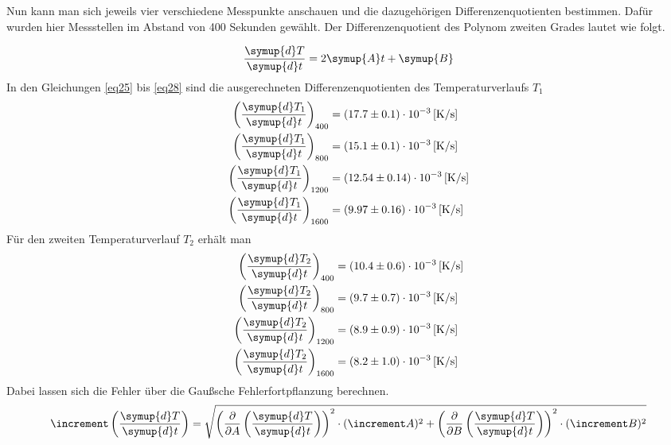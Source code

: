 \begin{flushleft}
Nun kann man sich jeweils vier verschiedene Messpunkte anschauen und die dazugehörigen Differenzenquotienten bestimmen. Dafür wurden hier
Messstellen im Abstand von 400 Sekunden gewählt.
Der Differenzenquotient des Polynom zweiten Grades lautet wie folgt.
\end{flushleft}
\begin{equation}
\frac{\symup{d}T}{\symup{d}t} = 2 \symup{A} t + \symup{B}
\end{equation}
In den Gleichungen \eqref{eq25} bis \eqref{eq28} sind die ausgerechneten Differenzenquotienten des Temperaturverlaufs $T_{1}$
\begin{align}
\left( \frac{\symup{d}T_{1}}{\symup{d}t}\right)_{400} &= (17.7\pm0.1)\cdot 10^{-3} \, \text{[K/s]} \label{eq25}\\
\left(\frac{\symup{d}T_{1}}{\symup{d}t}\right)_{800} &= (15.1\pm0.1)\cdot 10^{-3} \,\text{[K/s]}\\
\left(\frac{\symup{d}T_{1}}{\symup{d}t}\right)_{1200} &= (12.54\pm0.14)\cdot 10^{-3} \, \text{[K/s]}\\
\left(\frac{\symup{d}T_{1}}{\symup{d}t}\right)_{1600} &= (9.97\pm0.16)\cdot 10^{-3} \, \text{[K/s]} \label{eq28}
\end{align}
Für den zweiten Temperaturverlauf $T_{2}$ erhält man
\begin{align}
\left( \frac{\symup{d}T_{2}}{\symup{d}t}\right)_{400} &= (10.4\pm0.6)\cdot 10^{-3} \, \text{[K/s]} \label{eq29}\\
\left(\frac{\symup{d}T_{2}}{\symup{d}t}\right)_{800} &= (9.7\pm0.7)\cdot 10^{-3} \,\text{[K/s]}\\
\left(\frac{\symup{d}T_{2}}{\symup{d}t}\right)_{1200} &= (8.9\pm0.9)\cdot 10^{-3} \, \text{[K/s]}\\
\left(\frac{\symup{d}T_{2}}{\symup{d}t}\right)_{1600} &= (8.2\pm1.0)\cdot 10^{-3} \, \text{[K/s]} \label{eq32}
\end{align}
Dabei lassen sich die Fehler über die Gaußsche Fehlerfortpflanzung berechnen.
\begin{equation}
  \increment \left( \frac{\symup{d}T}{\symup{d}t}\right) = \sqrt{\left( \frac{\partial}{\partial A} \left( \frac{\symup{d}T}{\symup{d}t} \right)\right)^{2} \cdot (\increment A)^{2} + \left( \frac{\partial}{\partial B} \left( \frac{\symup{d}T}{\symup{d}t} \right)\right)^{2} \cdot (\increment B)^{2} }
  \label{eqn:gaussianmistake}
\end{equation}
